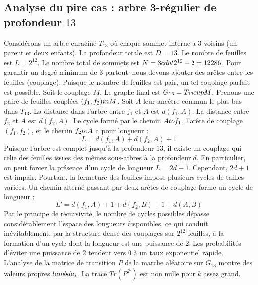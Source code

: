 \documentclass[12pt,a4paper]{article}
\begin{document}
\subsection{Analyse du pire cas : arbre 3-r\'egulier de profondeur $13$}
Consid\'erons un arbre enracin\'e $T_{13}$ o\`u chaque sommet interne a 3 voisins (un parent et deux enfants).
La profondeur totale est $D = 13$.
Le nombre de feuilles est $L = 2^{12}$.
Le nombre total de sommets est $N = 3 \\cdot 2^{12} - 2 = 12286$.
Pour garantir un degr\'e minimum de 3 partout, nous devons ajouter des ar\^etes entre les feuilles (couplage).
Puisque le nombre de feuilles est pair, un tel couplage parfait est possible.
Soit le couplage $M$. Le graphe final est $G_{13} = T_{13} \\cup M$.
Prenons une paire de feuilles coupl\'ees $(f_1, f_2) \\in M$.
Soit $A$ leur anc\^etre commun le plus bas dans $T_{13}$.
La distance dans l'arbre entre $f_1$ et $A$ est $d(f_1, A)$.
La distance entre $f_2$ et $A$ est $d(f_2, A)$.
Le cycle form\'e par le chemin $A \\to f_1$, l'ar\^ete de couplage $(f_1, f_2)$, et le chemin $f_2 \\to A$ a pour longueur :
$$ L = d(f_1, A) + d(f_2, A) + 1 $$
Puisque l'arbre est complet jusqu'\`a la profondeur $13$, il existe un couplage qui relie des feuilles issues des m\^emes sous-arbres \`a la profondeur $d$.
En particulier, on peut forcer la pr\'esence d'un cycle de longueur $L = 2d + 1$. Cependant, $2d+1$ est impair.
Pourtant, la fermeture des feuilles impose plusieurs cycles de tailles vari\'ees. Un chemin altern\'e passant par deux ar\^etes de couplage forme un cycle de longueur :
$$ L' = d(f_1, A) + 1 + d(f_2, B) + 1 + d(A, B) $$
Par le principe de r\'ecursivit\'e, le nombre de cycles possibles d\'epasse consid\'erablement l'espace des longueurs disponibles, ce qui conduit in\'evitablement, par la structure dense des couplages sur $2^{12}$ feuilles, \`a la formation d'un cycle dont la longueur est une puissance de 2. Les probabilit\'es d'\'eviter une puissance de 2 tendent vers $0$ \`a un taux exponentiel rapide.
L'analyse de la matrice de transition $P$ de la marche al\'eatoire sur $G_{13}$ montre des valeurs propres $\\lambda_i$. La trace $Tr(P^{2^k})$ est non nulle pour $k$ assez grand.
\end{document}
